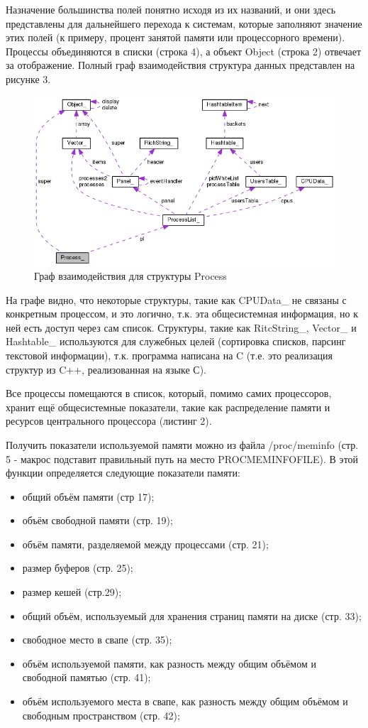 \documentclass[a4paper, 12pt]{article}		%
\begin{document}
Назначение большинства полей понятно исходя из их названий, и они здесь представлены для дальнейшего перехода к системам, которые заполняют значение этих полей (к примеру, процент занятой памяти или процессорного времени). Процессы объединяются в списки (строка 4), а объект Object (строка 2) отвечает за отображение. Полный граф взаимодействия структура данных представлен на рисунке 3.

\begin{figure}[h!]
\centering
\includegraphics[scale=0.7]{res/process.png}
\caption{Граф взаимодействия для структуры Process}
\end{figure}

На графе видно, что некоторые структуры, такие как CPUData\_ не связаны с конкретным процессом, и это логично, т.к. эта общесистемная информация, но к ней есть доступ через сам список. Структуры, такие как RitcString\_, Vector\_ и Hashtable\_ используются для служебных целей (сортировка списков, парсинг текстовой информации), т.к. программа написана на C (т.е. это реализация структур из C++, реализованная на языке С).

Все процессы помещаются в список, который, помимо самих процессоров, хранит ещё общесистемные показатели, такие как распределение памяти и ресурсов центрального процессора (листинг 2).

Получить показатели используемой памяти можно из файла /proc/meminfo (стр. 5 - макрос подставит правильный путь на место PROCMEMINFOFILE). В этой функции определяется следующие показатели памяти:
\begin{itemize}
\item общий объём памяти (стр 17);
\item объём свободной памяти (стр. 19);
\item объём памяти, разделяемой между процессами (стр. 21);
\item размер буферов (стр. 25);
\item размер кешей (стр.29);
\item общий объём, используемый для хранения страниц памяти на диске (стр. 33);
\item свободное место в свапе (стр. 35);
\item объём используемой памяти, как разность между общим объёмом и свободной памятью (стр. 41);
\item объём используемого места в свапе, как разность между общим объёмом и свободным пространством (стр. 42);
\end{itemize}
\end{document}
